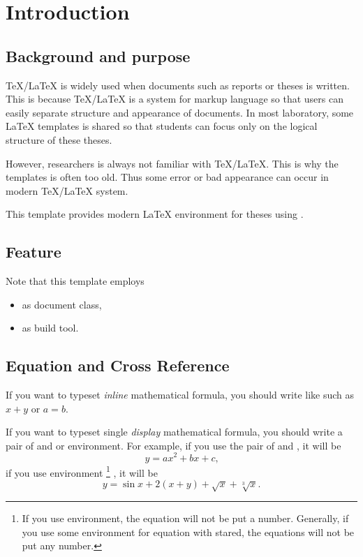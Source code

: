 \chapter{Introduction} \label{chap:introduction}

\section{Background and purpose} \label{sec:chap::introduction_background}

{\TeX}/{\LaTeX} is widely used when documents such as reports or theses is written.
This is because {\TeX}/{\LaTeX} is a system for markup language
so that users can easily separate
structure and appearance of documents.
In most laboratory, some {\LaTeX} templates is shared so that students can focus only on
the logical structure of these theses.

However, researchers is always not familiar with {\TeX}/{\LaTeX}.
This is why the templates is often too old.
Thus some error or bad appearance can occur in modern {\TeX}/{\LaTeX} system.

This template provides modern {\LaTeX} environment for theses using {\pdfLaTeX}.

\section{Feature} \label{sec:chap::introduction_feature}

Note that this template employs
\begin{itemize}
    \item {} as document class,
    \item {} as build tool.
\end{itemize}

\section{Equation and Cross Reference} \label{sec:chap::introduction_equation}

If you want to typeset \emph{inline} mathematical formula,
you should write like 
such as $x + y$ or $a = b$.

If you want to typeset single \emph{display} mathematical formula, you should write a pair of
\verbcode{\[} and \verbcode{\]} or  environment.
For example, if you use the pair of \verbcode{\[} and \verbcode{\]},
it will be
\[
    y = ax^2 + bx + c \text{,}
\]
if you use  environment%
\footnote{%
    If you use  environment,
    the equation will not be put a number.
    Generally, if you use some environment for equation with stared,
    the equations will not be put any number.
}%
, it will be
\begin{equation}
    y = \sin x + 2 (x + y) + \sqrt{x} + \sqrt[3]{x} \text{.}
    \label{eq:chap::introduction_sec::background_sinparensqrt}
\end{equation}

